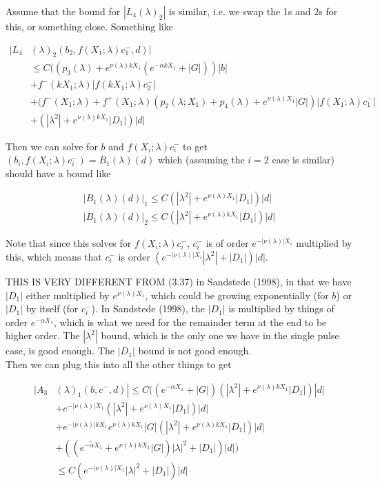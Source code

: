 \documentclass[12pt]{article}
\begin{document}
\begin{enumerate}
Assume that the bound for $|L_4(\lambda)_2|$ is similar, i.e. we swap the 1s and 2s for this, or something close. Something like

\begin{align*}
|L_4&(\lambda)_2(b_2, f(X_1; \lambda) c_1^-, d)|\\ 
&\leq C( ( p_3(\lambda) + e^{\nu(\lambda)k X_1} (e^{-\alpha k X_1} + |G|)) |b| \\
&+ f^-( k X_1; \lambda) |f(k X_1; \lambda) c_2^-| \\
&+ (f^-(X_1; \lambda) + f^+(X_1; \lambda) (p_2(\lambda; X_1) + p_4(\lambda) + e^{\nu(\lambda)X_1}|G| ) | f(X_1; \lambda) c_1^-| \\
&+ (|\lambda^2| + e^{\nu(\lambda)k X_1}|D_1|)|d|
\end{align*} 

Then we can solve for $b$ and $f(X_i; \lambda) c_i^-$ to get $(b_i, f(X_i; \lambda) c_i^-) = B_1(\lambda)(d)$ which (assuming the $i = 2$ case is similar) should have a bound like

\begin{align}
|B_1(\lambda)(d)|_1 \leq C(|\lambda^2| + e^{\nu(\lambda) X_1}|D_1|)|d| \\
|B_1(\lambda)(d)|_2 \leq C(|\lambda^2| + e^{\nu(\lambda)k X_1}|D_1|)|d|
\end{align}

Note that since this solves for $f(X_i; \lambda) c_i^-$, $c_i^-$ is of order $e^{-|\nu(\lambda)|X_i}$ multiplied by this, which means that $c_i^-$ is order $(e^{-|\nu(\lambda)|X_i}|\lambda^2| + |D_1|)|d|$.

THIS IS VERY DIFFERENT FROM (3.37) in Sandstede (1998), in that we have $|D_1|$ either multiplied by $e^{\nu(\lambda)X_1}$, which could be growing exponentially (for $b$) or $|D_1|$ by itself (for $c_i^-$). In Sandstede (1998), the $|D_1|$ is multiplied by things of order $e^{-\alpha X_1}$, which is what we need for the remainder term at the end to be higher order. The $|\lambda^2|$ bound, which is the only one we have in the single pulse case, is good enough. The $|D_1|$ bound is not good enough.\\

Then we can plug this into all the other things to get

\begin{align*}
|A_3&(\lambda)_1(b, c^-, d)| \leq C ((e^{-\alpha X_1} + |G|) (|\lambda^2| + e^{\nu(\lambda)k X_1}|D_1|)|d| \\
&+ e^{-|\nu(\lambda)| X_1}(|\lambda^2| + e^{\nu(\lambda) X_1}|D_1|)|d| \\
&+ e^{-|\nu(\lambda)| k X_1} e^{\nu(\lambda)k X_1} |G| (|\lambda^2| + e^{\nu(\lambda) k X_1}|D_1|)|d|\\
&+ ((e^{-\tilde{\alpha} X_1} + e^{\nu(\lambda)k X_1} |G|) |\lambda|^2 + |D_1| )|d| ) \\
&\leq C( e^{-|\nu(\lambda)|X_1} |\lambda|^2 + |D_1|) |d| 
\end{align*}


\end{enumerate}
\end{document}
